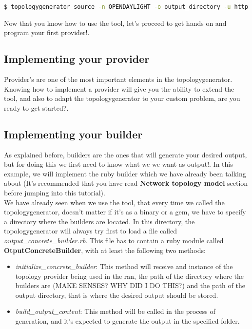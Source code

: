 \begin{lstlisting}[language=bash,breaklines=true]
$ topologygenerator source -n OPENDAYLIGHT -o output_directory -u http://localhost:8080/restconf/operational/network-topology:network-topology/topology/flow:1/ -d builders_examples/ruby_builders
\end{lstlisting}

Now that you know how to use the tool, let's proceed to get hands on and program your first provider!.

\subsection{Implementing your provider}

Provider's are one of the most important elements in the topologygenerator. Knowing how to implement a provider will give you the ability to extend the tool, and also to adapt the topologygenerator to your custom problem, are you ready to get started?. \\




\subsection{Implementing your builder}

As explained before, builders are the ones that will generate your desired output, but for doing this we first need to know what we we want as output!. In this example, we will implement the ruby builder which we have already been talking about (It's recommended that you have read \textbf{Network topology model} section before jumping into this tutorial). \\

We have already seen when we use the tool, that every time we called the topologygenerator, doesn't matter if it's as a binary or a gem, we have to specify a directory where the builders are located. In this directory, the topologygenerator will always try first to load a file called \textit{output\_concrete\_builder.rb}. This file has to contain a ruby module called \textbf{OtputConcreteBuilder}, with at least the following two methods: 
\begin{itemize}
\item \textit{initialize\_concrete\_builder}: This method will receive and instance of the topology provider being used in the ran, the path of the directory where the builders are (MAKE SENSES? WHY DID I DO THIS?) and the path of the output directory, that is where the desired output should be stored.
\item \textit{build\_output\_content}: This method will be called in the process of generation, and it's expected to generate the output in the specified folder.
\end{itemize}


